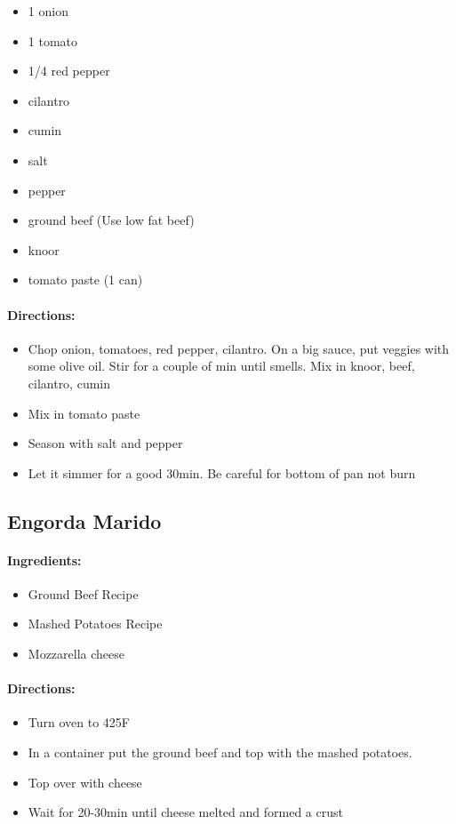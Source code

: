 \documentclass{article}
\begin{document}
\begin{itemize}
	\item 1 onion 
	\item 1 tomato 
	\item 1/4 red pepper 
	\item cilantro 
	\item cumin 
	\item salt 
	\item pepper 
	\item ground beef (Use low fat beef) 
	\item knoor 
	\item tomato paste (1 can)
\end{itemize}

\paragraph{Directions:}
\begin{itemize}
	\item Chop onion, tomatoes, red pepper, cilantro. On a big sauce, put veggies with some olive oil. Stir for a couple of min until smells. Mix in knoor, beef, cilantro, cumin 
	\item Mix in tomato paste 
	\item Season with salt and pepper 
	\item Let it simmer for a good 30min. Be careful for bottom of pan not burn
\end{itemize}

\subsection{Engorda Marido}

\paragraph{Ingredients:}

\begin{itemize}
	\item Ground Beef Recipe
	\item Mashed Potatoes Recipe
	\item Mozzarella cheese
\end{itemize}

\paragraph{Directions:}
\begin{itemize}
	\item Turn oven to 425F
	\item In a container put the ground beef and top with the mashed potatoes.
	\item Top over with cheese
	\item Wait for 20-30min until cheese melted and formed a crust
\end{itemize}
\end{document}
